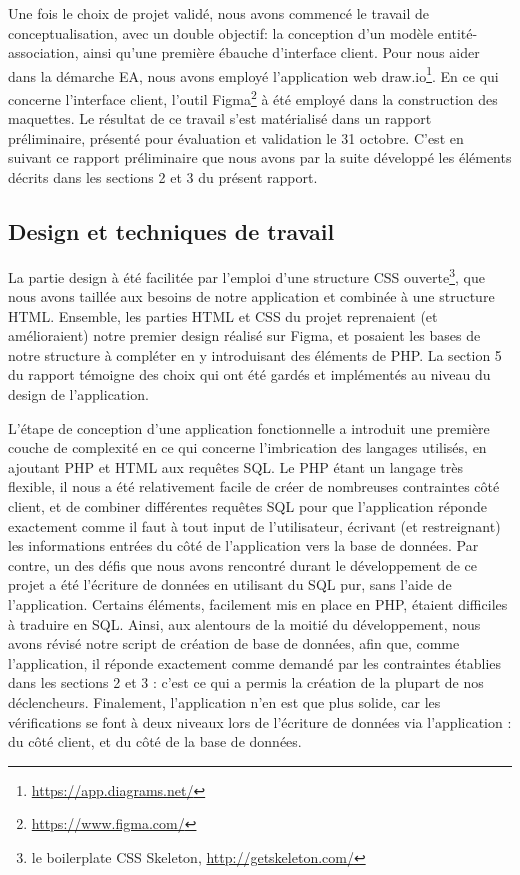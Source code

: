 \documentclass[a4paper,12pt]{article}
\begin{document}
Une fois le choix de projet validé, nous avons commencé le travail de conceptualisation, avec un double objectif: la conception d'un modèle entité-association, ainsi qu'une première ébauche d'interface client.
Pour nous aider dans la démarche EA, nous avons employé l'application web draw.io\footnote{\url{https://app.diagrams.net/}}.
En ce qui concerne l'interface client, l'outil Figma\footnote{\url{https://www.figma.com/}} à été employé dans la construction des maquettes.
Le résultat de ce travail s'est matérialisé dans un rapport préliminaire, présenté pour évaluation et validation le 31 octobre.
C'est en suivant ce rapport préliminaire que nous avons par la suite développé les éléments décrits dans les sections 2 et 3 du présent rapport.
 
\subsection{Design et techniques de travail }

La partie design à été facilitée par l'emploi d'une structure CSS ouverte\footnote{le boilerplate CSS Skeleton, \url{http://getskeleton.com/}}, que nous avons taillée aux besoins de notre application et combinée à une structure HTML.
Ensemble, les parties HTML et CSS du projet reprenaient (et amélioraient) notre premier design réalisé sur Figma, et posaient les bases de notre structure à compléter en y introduisant des éléments de PHP.
La section 5 du rapport témoigne des choix qui ont été gardés et implémentés au niveau du design de l'application.

L'étape de conception d'une application fonctionnelle a introduit une première couche de complexité en ce qui concerne l'imbrication des langages utilisés, en ajoutant PHP et HTML aux requêtes SQL.
Le PHP étant un langage très flexible, il nous a été relativement facile de créer de nombreuses contraintes côté client, et de combiner différentes requêtes SQL pour que l'application réponde exactement comme il faut à tout input de l'utilisateur, écrivant (et restreignant) les informations entrées du côté de l'application vers la base de données. 
Par contre, un des défis que nous avons rencontré durant le développement de ce projet a été l'écriture de données en utilisant du SQL pur, sans l'aide de l'application.
Certains éléments, facilement mis en place en PHP, étaient difficiles à traduire en SQL.
Ainsi, aux alentours de la moitié du développement, nous avons révisé notre script de création de base de données, afin que, comme l'application, il réponde exactement comme demandé par les contraintes établies dans les sections 2 et 3 : c'est ce qui a permis la création de la plupart de nos déclencheurs.
Finalement, l'application n'en est que plus solide, car les vérifications se font à deux niveaux lors de l'écriture de données via l'application : du côté client, et du côté de la base de données.
\end{document}
